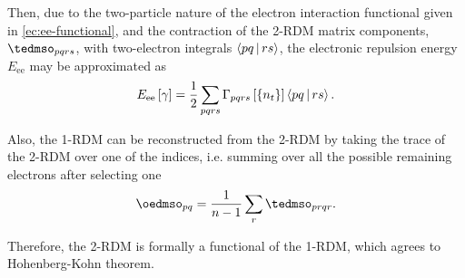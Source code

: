 Then, due to the two-particle nature of the electron interaction functional
given in \cref{ec:ee-functional}, and the contraction of the 2-RDM matrix components,
$\tedmso_{pqrs}$, with two-electron integrals $\Braket{pq | rs}$, the
electronic repulsion energy $E_{\text{ee}}$ may be approximated as
\begin{equation} \label{eq:Eee_from_Gamma}
    E_{\text{ee}} \left[ \fordm \right]
    =
    \frac{1}{2} \sum_{pqrs}
    \sordm_{pqrs}\left[ \left\{ n_t \right\} \right] 
    \Braket{pq | rs}
    .
\end{equation}

Also, the 1-RDM can be reconstructed from the 2-RDM by taking the trace of the
2-RDM over one of the indices, i.e. summing over all the possible remaining
electrons after selecting one 
\begin{equation} \label{eq:1rdm-from-2rdm}
    \oedmso_{pq} =
    \frac{1}{n-1} \sum_{r} \tedmso_{prqr}
    .
\end{equation}

Therefore, the 2-RDM is formally a functional of the 1-RDM, which agrees to
Hohenberg-Kohn theorem. %


